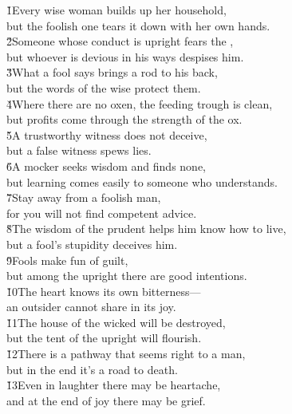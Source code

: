 \begin{poetry}
\poeml {}
\v{1}Every wise woman builds up her household, \\
\poeml but the foolish one tears it down with her own hands. \\
\poeml \v{2}Someone whose conduct is upright fears the , \\
\poemll    but whoever is devious in his ways despises him. \\
\poeml \v{3}What a fool says brings a rod to his back, \\
\poemll    but the words of the wise protect them. \\
\poeml \v{4}Where there are no oxen, the feeding trough is clean, \\
\poemll    but profits come through the strength of the ox. \\
\poeml \v{5}A trustworthy witness does not deceive, \\
\poemll    but a false witness spews lies. \\
\poeml \v{6}A mocker seeks wisdom and finds none, \\
\poemll    but learning comes easily to someone who understands. \\
\poeml \v{7}Stay away from a foolish man, \\
\poemll    for you will not find competent advice. \\
\poeml \v{8}The wisdom of the prudent helps him know how to live, \\
\poemll    but a fool's stupidity deceives him. \\
\poeml \v{9}Fools make fun of guilt, \\
\poemll    but among the upright there are good intentions. \\
\poeml \v{10}The heart knows its own bitterness--- \\
\poemll    an outsider cannot share in its joy. \\
\poeml \v{11}The house of the wicked will be destroyed, \\
\poemll    but the tent of the upright will flourish. \\
\poeml \v{12}There is a pathway that seems right to a man, \\
\poemll    but in the end it's a road to death. \\
\poeml \v{13}Even in laughter there may be heartache, \\
\poemll    and at the end of joy there may be grief. \\

\end{poetry}
